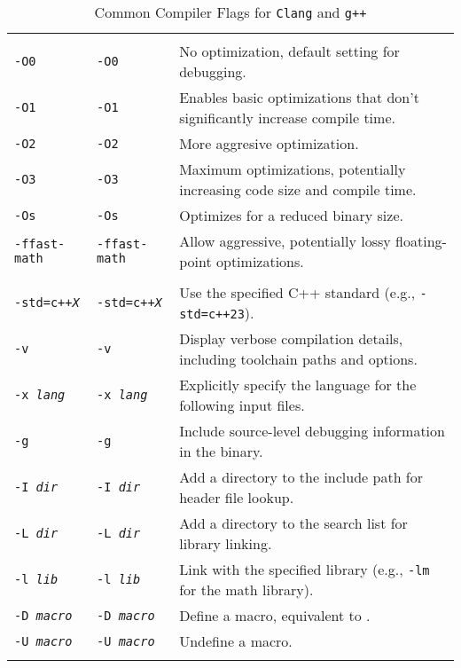 \documentclass[12pt]{article}
\begin{document}
\begin{center}
\begin{longtable}{>{\raggedright\arraybackslash}p{} >{\raggedright\arraybackslash}p{} >{\raggedright\arraybackslash}p{}}
	\multicolumn{3}{l}{\textbf{Optimization Flags}}\\
	\texttt{-O0} & \texttt{-O0} & No optimization, default setting for debugging. \\
	\texttt{-O1} & \texttt{-O1} & Enables basic optimizations that don't significantly increase compile time. \\
	\texttt{-O2} & \texttt{-O2} & More aggresive optimization. \\
	\texttt{-O3} & \texttt{-O3} & Maximum optimizations, potentially increasing code size and compile time. \\
	\texttt{-Os} & \texttt{-Os} & Optimizes for a reduced binary size. \\
	\texttt{-ffast-math} & \texttt{-ffast-math} & Allow aggressive, potentially lossy floating-point optimizations. \\

	\midrule
	\multicolumn{3}{l}{\textbf{Additional Flags}}\\
	\texttt{-std=c++\itshape{X}} & \texttt{-std=c++\itshape{X}} & Use the specified C++ standard (e.g., \texttt{-std=c++23}). \\
	\texttt{-v} & \texttt{-v} & Display verbose compilation details, including toolchain paths and options. \\
	\texttt{-x \itshape{lang}} & \texttt{-x \itshape{lang}} & Explicitly specify the language for the following input files. \\
	\texttt{-g} & \texttt{-g} & Include source-level debugging information in the binary. \\
	\texttt{-I \itshape{dir}} & \texttt{-I \itshape{dir}} & Add a directory to the include path for header file lookup. \\
	\texttt{-L \itshape{dir}} & \texttt{-L \itshape{dir}} & Add a directory to the search list for library linking. \\
	\texttt{-l \itshape{lib}} & \texttt{-l \itshape{lib}} & Link with the specified library (e.g., \texttt{-lm} for the math library). \\
	\texttt{-D \itshape{macro}} & \texttt{-D \itshape{macro}} & Define a macro, equivalent to \inlinecxx{#define macro}. \\
	\texttt{-U \itshape{macro}} & \texttt{-U \itshape{macro}} & Undefine a macro. \\
	\bottomrule[1.5pt]

	\caption{Common Compiler Flags for \texttt{Clang} and \texttt{g++}}
	\label{tab:compiler-flags}
\end{longtable}
\end{center}
\end{document}
